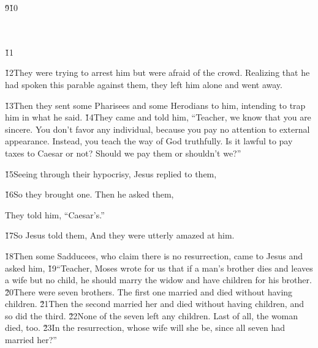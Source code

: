 \v{9}\v{10}

\begin{poetry}
\poeml {} \\
\poemll    {} \\
\poeml \v{11} \\
\poemll    {}
\end{poetry}

\v{12}They were trying to arrest him but were afraid of the crowd. Realizing that he had spoken this parable against them, they left him alone and went away.

\v{13}Then they sent some Pharisees and some Herodians to him, intending to trap him in what he said. \v{14}They came and told him, ``Teacher, we know that you are sincere. You don't favor any individual, because you pay no attention to external appearance. Instead, you teach the way of God truthfully. Is it lawful to pay taxes to Caesar or not? Should we pay them or shouldn't we?''

\v{15}Seeing through their hypocrisy, Jesus replied to them, 

\v{16}So they brought one. Then he asked them, 

They told him, ``Caesar's.''

\v{17}So Jesus told them,  And they were utterly amazed at him.

\v{18}Then some Sadducees, who claim there is no resurrection, came to Jesus and asked him, \v{19}``Teacher, Moses wrote for us that if a man's brother dies and leaves a wife but no child, he should marry the widow and have children for his brother. \v{20}There were seven brothers. The first one married and died without having children. \v{21}Then the second married her and died without having children, and so did the third. \v{22}None of the seven left any children. Last of all, the woman died, too. \v{23}In the resurrection, whose wife will she be, since all seven had married her?''

